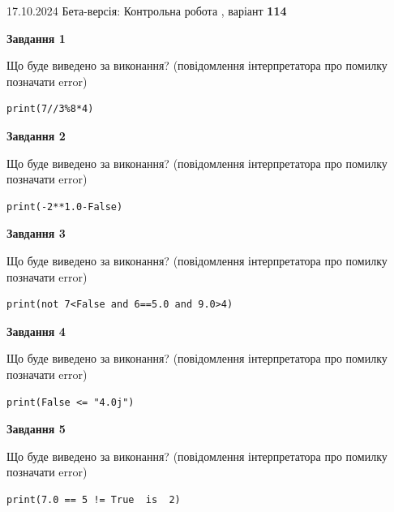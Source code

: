 \documentclass[12pt, ukrainian]{article}
\begin{document}
{\Large{17.10.2024 Бета-версія: Контрольна робота , варіант  \No \textbf { 114 }\par}}
{
\begin {large}
{\begin {center}\textbf{Завдання 1}\end {center}}

Що буде виведено за виконання? (повідомлення інтерпретатора про помилку позначати error)\par
\begin{verbatim}
print(7//3%8*4)
\end{verbatim}

{\begin {center}\textbf{Завдання 2}\end {center}}

Що буде виведено за виконання? (повідомлення інтерпретатора про помилку позначати error)\par
\begin{verbatim}
print(-2**1.0-False)
\end{verbatim}

{\begin {center}\textbf{Завдання 3}\end {center}}

Що буде виведено за виконання? (повідомлення інтерпретатора про помилку позначати error)\par
\begin{verbatim}
print(not 7<False and 6==5.0 and 9.0>4)
\end{verbatim}

{\begin {center}\textbf{Завдання 4}\end {center}}

Що буде виведено за виконання? (повідомлення інтерпретатора про помилку позначати error)\par
\begin{verbatim}
print(False <= "4.0j")
\end{verbatim}

{\begin {center}\textbf{Завдання 5}\end {center}}

Що буде виведено за виконання? (повідомлення інтерпретатора про помилку позначати error)\par
\begin{verbatim}
print(7.0 == 5 != True  is  2)
\end{verbatim}


\end{large}}
\end{document}
